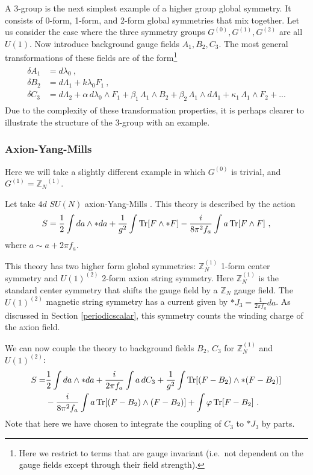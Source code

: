 \documentclass[11pt]{article}
\newcommand{\eq}[1]{\begin{align}\begin{split}#1\end{split}\end{align}}
\def\Tr{{\rm Tr}}
\def\half{\frac{1}{2}}
\def\IZ{{\mathbb{Z}}}
\def\IZN{{\mathbb{Z}_N}}
\begin{document}
A 3-group is the next simplest example of a higher group global symmetry. It consists of 0-form, 1-form, and 2-form global symmetries that mix together. Let us consider the case where the three symmetry groups $G^{(0)},G^{(1)},G^{(2)}$ are all $U(1)$. Now introduce background gauge fields $A_1,B_2,C_3$. The most general transformations of these fields are of the form\footnote{Here we restrict to terms that are gauge invariant (i.e.~not dependent on the gauge fields except through their field strength).}
\eq{
\delta A_1&=d\lambda_0~,\\
\delta B_2&=d\Lambda_1+k \lambda_0 F_1~,\\
\delta C_3&= d\Lambda_2+\alpha \, d\lambda_0 \wedge F_1+\beta_1\,  \Lambda_1\wedge B_2+\beta_2\,  \Lambda_1\wedge d\Lambda_1+\kappa_1\,  \Lambda_1\wedge F_2+...
}
Due to the complexity of these transformation properties, it is perhaps clearer to illustrate the structure of the 3-group with an  example. 

\subsubsection{Axion-Yang-Mills}

Here we will take a slightly different example in which $G^{(0)}$ is trivial, and $G^{(1)}=\IZN^{(1)}$. 

Let take $4d$  $SU(N)$ axion-Yang-Mills \cite{Brennan:2020ehu,Cordova:2019uob,Hidaka:2020iaz,Hidaka:2020izy}. This theory is described by the action 
\eq{
S=\half \int da\wedge \ast da+\frac{1}{g^2}\int \Tr[F\wedge \ast F]- \frac{i}{8\pi^2 f_a}\int a\,\Tr[F\wedge F]~,
}
where $a\sim a+2\pi f_a$. 

This theory has two higher form global symmetries: $\IZ_N^{(1)}$ 1-form center symmetry and $U(1)^{(2)}$ 2-form axion string symmetry. Here $\IZ_N^{(1)}$ is the standard center symmetry that shifts the gauge field by a $\IZ_N$ gauge field.  The $U(1)^{(2)}$ magnetic string symmetry has  a current given by $\ast J_3=\frac{1}{2\pi f_a}da$. 
As discussed in Section \ref{periodicscalar}, this symmetry counts the winding charge of the axion field. 

We can now couple the theory to background fields $B_2$, $C_3$ for $\IZ_N^{(1)}$ and $U(1)^{(2)}$:
\eq{
S=&\half \int da\wedge \ast da+\frac{i}{2\pi f_a} \int a\, dC_3+\frac{1}{g^2}\int \Tr[(F-B_2)\wedge \ast (F-B_2)]\\
&- \frac{i}{8\pi^2 f_a}\int a\,\Tr[(F-B_2)\wedge (F-B_2)]+\int \varphi\, \Tr[F-B_2]~. 
}
Note that here we have chosen to integrate the coupling of $C_3$ to $\ast J_3$ by parts.
\end{document}
